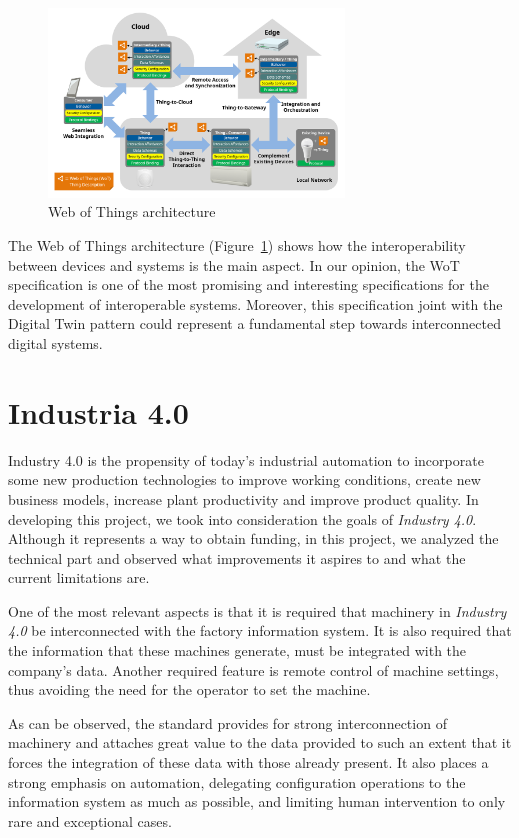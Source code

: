 \begin{figure}[h]
	\centering
	\includegraphics[width=0.7\textwidth]{img/wot.png}
	\caption{Web of Things architecture}
	\label{fig:iot}
\end{figure}

The Web of Things architecture (Figure~\ref{fig:iot}) shows how the interoperability between devices and systems is the main aspect.
In our opinion, the WoT specification is one of the most promising and interesting specifications for the development of interoperable systems.
Moreover, this specification joint with the Digital Twin pattern could represent a fundamental step towards interconnected digital systems.

\section{Industria 4.0}
Industry 4.0 is the propensity of today's industrial automation to incorporate some new production technologies to improve working conditions, create
new business models, increase plant productivity and improve product quality.
In developing this project, we took into consideration the goals of \textit{Industry 4.0}. Although it represents a way to obtain funding,
in this project, we analyzed the technical part and observed what improvements it aspires to and what the current limitations are.

One of the most relevant aspects is that it is required that machinery in \textit{Industry 4.0} be interconnected with the factory information
system. It is also required that the information that these machines generate, must be integrated with the company's data.
Another required feature is remote control of machine settings, thus avoiding the need for the operator to set the machine.

As can be observed, the standard provides for strong interconnection of machinery and attaches great value to the data provided to such an extent that it forces the integration of these data with those already present. It also places a strong emphasis on automation, delegating configuration operations to the information system as much as possible, and limiting human intervention to only rare and exceptional cases.
